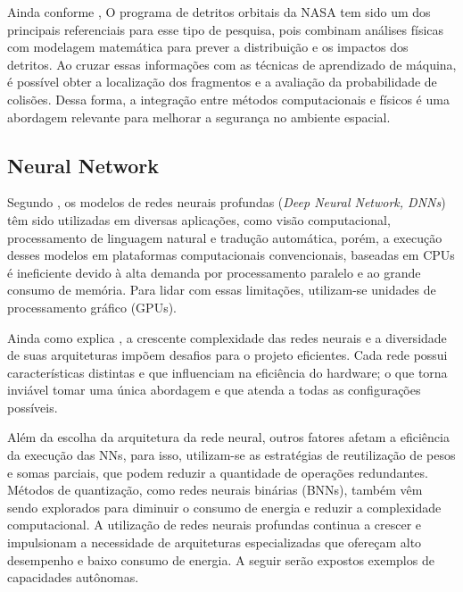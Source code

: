 Ainda conforme \cite{sri2024},
O programa de detritos orbitais da NASA tem sido um dos principais referenciais para esse tipo de pesquisa, pois combinam análises físicas com modelagem matemática para prever a distribuição e os impactos dos detritos.
Ao cruzar essas informações com as técnicas de aprendizado de máquina, é possível obter a localização dos fragmentos e a avaliação da probabilidade de colisões.
Dessa forma, a integração entre métodos computacionais e físicos é uma abordagem relevante para melhorar a segurança no ambiente espacial.

\subsection{Neural Network}

Segundo \cite{ke2018}, os modelos de redes neurais profundas (\emph{Deep Neural Network, DNNs}) têm sido utilizadas em diversas aplicações, como visão computacional, processamento de linguagem natural e tradução automática, porém, a execução desses modelos em plataformas computacionais convencionais, baseadas em CPUs é ineficiente devido à alta demanda por processamento paralelo e ao grande consumo de memória.
Para lidar com essas limitações, utilizam-se unidades de processamento gráfico (GPUs).

Ainda como explica \cite{ke2018}, a crescente complexidade das redes neurais e a diversidade de suas arquiteturas impõem desafios para o projeto eficientes.
Cada rede possui características distintas e que influenciam na eficiência do hardware; o que torna inviável tomar uma única abordagem e que atenda a todas as configurações possíveis.

Além da escolha da arquitetura da rede neural, outros fatores afetam a eficiência da execução das NNs, para isso, utilizam-se as estratégias de reutilização de pesos e somas parciais, que podem reduzir a quantidade de operações redundantes.
Métodos de quantização, como redes neurais binárias (BNNs), também vêm sendo explorados para diminuir o consumo de energia e reduzir a complexidade computacional.
A utilização de redes neurais profundas continua a crescer e impulsionam a necessidade de arquiteturas especializadas que ofereçam alto desempenho e baixo consumo de energia.
A seguir serão expostos exemplos de capacidades autônomas.

